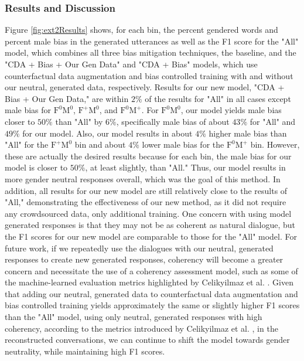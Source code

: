 \subsubsection{Results and Discussion}
Figure \ref{fig:ext2Results} shows, for each bin, the percent gendered words and percent male bias in the generated utterances as well as the F1 score for the "All" model, which combines all three bias mitigation techniques, the baseline, and the "CDA + Bias + Our Gen Data" and "CDA + Bias" models, which use counterfactual data augmentation and bias controlled training with and without our neutral, generated data, respectively. Results for our new model, "CDA + Bias + Our Gen Data," are within $2\%$ of the results for "All" in all cases except male bias for $\mathrm{F}^0\mathrm{M}^0$, $\mathrm{F}^+\mathrm{M}^0$, and $\mathrm{F}^0\mathrm{M}^+$. For $\mathrm{F}^0\mathrm{M}^0$, our model yields male bias closer to $50\%$ than "All" by $6\%$, specifically male bias of about $43\%$ for "All" and $49\%$ for our model. Also, our model results in about $4\%$ higher male bias than "All" for the $\mathrm{F}^+\mathrm{M}^0$ bin and about $4\%$ lower male bias for the $\mathrm{F}^0\mathrm{M}^+$ bin. However, these are actually the desired results because for each bin, the male bias for our model is closer to $50\%$, at least slightly, than "All." Thus, our model results in more gender neutral responses overall, which was the goal of this method. In addition,  all results for our new model are still relatively close to the results of "All," demonstrating the effectiveness of our new method, as it did not require any crowdsourced data, only additional training. One concern with using model generated responses is that they may not be as coherent as natural dialogue, but the F1 scores for our new model are comparable to those for the "All" model. For future work, if we repeatedly use the dialogues with our neutral, generated responses to create new generated responses, coherency will become a greater concern and necessitate the use of a coherency assessment model, such as some of the machine-learned evaluation metrics highlighted by Celikyilmaz et al. \supercite{celikyilmaz2020evaluation}. Given that adding our neutral, generated data to counterfactual data augmentation and bias controlled training yields approximately the same or slightly higher F1 scores than the "All" model, using only neutral, generated responses with high coherency, according to the metrics introduced by Celikyilmaz et al. \supercite{celikyilmaz2020evaluation}, in the reconstructed conversations, we can continue to shift the model towards gender neutrality, while maintaining high F1 scores.


